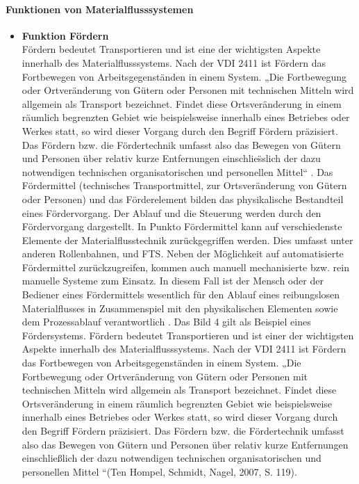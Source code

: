 \begin{itemize}
\paragraph{Funktionen von Materialflusssystemen}
\begin{itemize}
	\item \textbf{Funktion F\"ordern} \\
	F\"ordern bedeutet Transportieren und ist eine der wichtigsten Aspekte innerhalb des Materialflusssystems. Nach der VDI 2411 ist F\"ordern das Fortbewegen von Arbeitsgegenst\"anden in einem System. „Die Fortbewegung oder Ortver\"anderung von G\"utern oder Personen mit technischen Mitteln wird allgemein als Transport bezeichnet. Findet diese Ortsver\"anderung in einem r\"aumlich begrenzten Gebiet wie beispielsweise innerhalb eines Betriebes oder Werkes statt, so wird dieser Vorgang durch den Begriff F\"ordern pr\"azisiert. Das F\"ordern bzw. die F\"ordertechnik umfasst also das Bewegen von G\"utern und Personen \"uber relativ kurze Entfernungen einschlie\"sslich der dazu notwendigen technischen organisatorischen und personellen Mittel“ \cite[S. 119]{Hompel:Schmidt:Nagel:2007}. 
Das F\"ordermittel (technisches Transportmittel, zur Ortsver\"anderung von G\"utern oder Personen) und das F\"orderelement bilden das physikalische Bestandteil eines F\"ordervorgang. Der Ablauf und die Steuerung werden durch den F\"ordervorgang dargestellt. In Punkto F\"ordermittel kann auf verschiedenste Elemente der Materialflusstechnik zur\"uckgegriffen werden. Dies umfasst unter anderen Rollenbahnen, und FTS. Neben der M\"oglichkeit auf automatisierte F\"ordermittel zur\"uckzugreifen, kommen auch manuell mechanisierte bzw. rein manuelle Systeme zum Einsatz. In diesem Fall ist der Mensch oder der Bediener eines F\"ordermittels wesentlich f\"ur den Ablauf eines reibungslosen Materialflusses in Zusammenspiel mit den physikalischen Elementen sowie dem Prozessablauf verantwortlich \cite[S. 8]{Wulz:Johannes:2008}. Das Bild 4 gilt als Beispiel eines F\"ordersystems. 
F\"ordern bedeutet Transportieren und ist einer der wichtigsten Aspekte innerhalb des Materialflusssystems.
Nach der VDI 2411 ist F\"ordern das Fortbewegen von Arbeitsgegenst\"anden in einem System.
„Die Fortbewegung oder Ortver\"anderung von G\"utern oder Personen mit technischen Mitteln wird allgemein als Transport bezeichnet.
Findet diese Ortsver\"anderung in einem r\"aumlich begrenzten Gebiet wie beispielsweise innerhalb eines Betriebes oder Werkes statt, so wird dieser Vorgang durch den Begriff F\"ordern pr\"azisiert.
Das F\"ordern bzw. die F\"ordertechnik umfasst also das Bewegen von G\"utern und Personen \"uber relativ kurze Entfernungen einschlie\ss lich der dazu notwendigen technischen organisatorischen und personellen Mittel “(Ten Hompel, Schmidt, Nagel, 2007, S. 119). 

\end{itemize}
\end{itemize}
